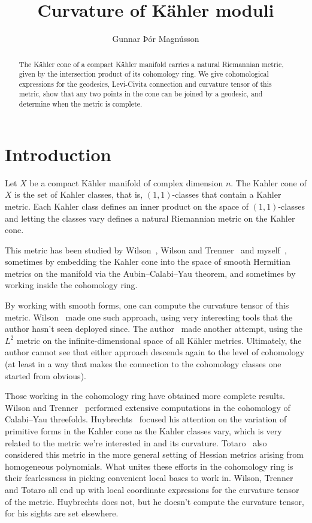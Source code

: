 \documentclass[11pt,a4paper]{amsart}
\title{Curvature of K\"{a}hler moduli}
\author{Gunnar Þór Magnússon}
\theoremstyle{definition}
\theoremstyle{remark}
\begin{document}
\begin{abstract}
The K\"{a}hler cone of a compact K\"ahler manifold carries a natural
Riemannian metric, given by the intersection product of its cohomology
ring. We give cohomological expressions for the geodesics, Levi-Civita
connection and curvature tensor of this metric, show that any two points
in the cone can be joined by a geodesic, and determine when the metric
is complete.
\end{abstract}

\maketitle



\section*{Introduction}

Let $X$ be a compact K\"{a}hler manifold of complex dimension $n$. The Kahler
cone of $X$ is the set of Kahler classes, that is, $(1,1)$-classes that contain
a Kahler metric. Each Kahler class defines an inner product on the space of
$(1,1)$-classes and letting the classes vary defines a natural Riemannian metric
on the Kahler cone. 

This metric has been studied by Wilson~\cite{Wilson}, Wilson and
Trenner~\cite{WilsonTrenner} and myself~\cite{Magnusson}, sometimes by embedding
the Kahler cone into the space of smooth Hermitian metrics on the manifold via
the Aubin--Calabi--Yau theorem, and sometimes by working inside the cohomology
ring.

By working with smooth forms, one can compute the curvature tensor of this
metric. Wilson~\cite{Wilson} made one such approach, using very interesting
tools that the author hasn't seen deployed since. The author~\cite{Magnusson}
made another attempt, using the $L^2$ metric on the infinite-dimensional space
of all K\"ahler metrics. Ultimately, the author cannot see that either approach
descends again to the level of cohomology (at least in a way that makes the
connection to the cohomology classes one started from obvious).

Those working in the cohomology ring have obtained more complete results.
Wilson and Trenner~\cite{WilsonTrenner} performed extensive computations in the
cohomology of Calabi--Yau threefolds. Huybrechts~\cite{Huybrechts} focused his
attention on the variation of primitive forms in the Kahler cone as the Kahler
classes vary, which is very related to the metric we're interested in and its
curvature. Totaro~\cite{totaro} also considered this metric in the more general
setting of Hessian metrics arising from homogeneous polynomials.  What unites
these efforts in the cohomology ring is their fearlessness in picking convenient
local bases to work in. Wilson, Trenner and Totaro all end up with local
coordinate expressions for the curvature tensor of the metric. Huybrechts does
not, but he doesn't compute the curvature tensor, for his sights are set
elsewhere.
\end{document}
